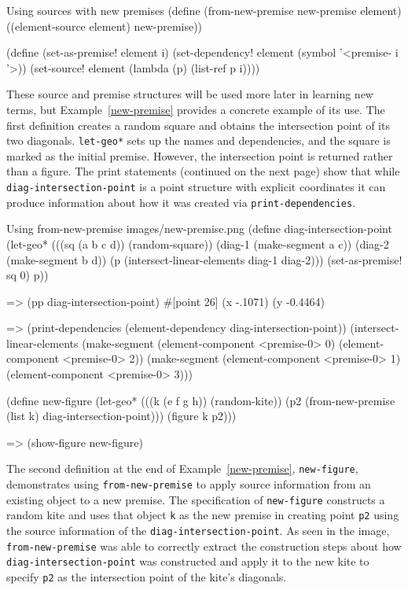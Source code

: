\begin{code-example}
[label=new-premises]
{Using sources with new premises}
(define (from-new-premise new-premise element)
  ((element-source element) new-premise))

(define (set-as-premise! element i)
  (set-dependency! element (symbol '<premise- i '>))
  (set-source! element (lambda (p) (list-ref p i))))
\end{code-example}

These source and premise structures will be used more later in
learning new terms, but Example~\ref{new-premise} provides a concrete
example of its use. The first definition creates a random square and
obtains the intersection point of its two diagonals. \texttt{let-geo*}
sets up the names and dependencies, and the square is marked as the
initial premise. However, the intersection point is returned rather
than a figure.  The print statements (continued on the next page) show
that while \texttt{diag-intersection-point} is a point structure with
explicit coordinates it can produce information about how it was
created via \texttt{print-dependencies}.

\begin{img-example}
[label=new-premise, breakable]
{Using from-new-premise}
{images/new-premise.png}
(define diag-intersection-point
  (let-geo*
      (((sq (a b c d)) (random-square))
       (diag-1 (make-segment a c))
       (diag-2 (make-segment b d))
       (p (intersect-linear-elements diag-1 diag-2)))
    (set-as-premise! sq 0)
    p))

=> (pp diag-intersection-point)
#[point 26] (x -.1071) (y -0.4464)

=> (print-dependencies (element-dependency diag-intersection-point))
(intersect-linear-elements
 (make-segment (element-component <premise-0> 0)
               (element-component <premise-0> 2))
 (make-segment (element-component <premise-0> 1)
               (element-component <premise-0> 3)))

(define new-figure
  (let-geo* (((k (e f g h)) (random-kite))
             (p2 (from-new-premise (list k) diag-intersection-point)))
    (figure k p2)))

=> (show-figure new-figure)
\end{img-example}

The second definition at the end of Example~\ref{new-premise},
\texttt{new-figure}, demonstrates using \texttt{from-new-premise} to
apply source information from an existing object to a new premise.
The specification of \texttt{new-figure} constructs a random kite and
uses that object \texttt{k} as the new premise in creating point
\texttt{p2} using the source information of the
\texttt{diag-intersection-point}. As seen in the image,
\texttt{from-new-premise} was able to correctly extract the
construction steps about how \texttt{diag-intersection-point} was
constructed and apply it to the new kite to specify \texttt{p2} as the
intersection point of the kite's diagonals.

